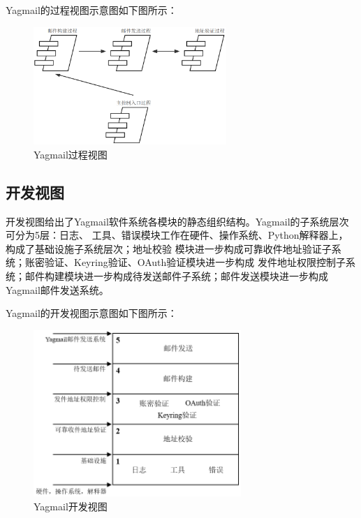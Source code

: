 \documentclass[UTF8,12pt,a4paper]{ctexart}
\begin{document}
    Yagmail的过程视图示意图如下图所示：
    
    \begin{figure}[H]
        \centering
        \includegraphics[width=0.65\textwidth]{figure/pro-view.png}
        \caption{Yagmail过程视图}
        \label{fig:pro-view}
    \end{figure}

\subsection{开发视图}

    开发视图给出了Yagmail软件系统各模块的静态组织结构。Yagmail的子系统层次可分为5层：日志、
    工具、错误模块工作在硬件、操作系统、Python解释器上，构成了基础设施子系统层次；地址校验
    模块进一步构成可靠收件地址验证子系统；账密验证、Keyring验证、OAuth验证模块进一步构成
    发件地址权限控制子系统；邮件构建模块进一步构成待发送邮件子系统；邮件发送模块进一步构成
    Yagmail邮件发送系统。
    
    Yagmail的开发视图示意图如下图所示：

    \begin{figure}[H]
        \centering
        \includegraphics[width=0.7\textwidth]{figure/dev-view.png}
        \caption{Yagmail开发视图}
        \label{fig:dev-view}
    \end{figure}
\end{document}

